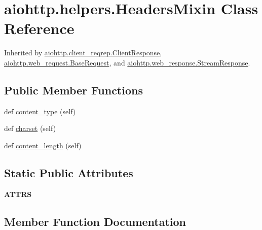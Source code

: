 \hypertarget{classaiohttp_1_1helpers_1_1_headers_mixin}{}\section{aiohttp.\+helpers.\+Headers\+Mixin Class Reference}
\label{classaiohttp_1_1helpers_1_1_headers_mixin}


Inherited by \hyperlink{classaiohttp_1_1client__reqrep_1_1_client_response}{aiohttp.\+client\+\_\+reqrep.\+Client\+Response}, \hyperlink{classaiohttp_1_1web__request_1_1_base_request}{aiohttp.\+web\+\_\+request.\+Base\+Request}, and \hyperlink{classaiohttp_1_1web__response_1_1_stream_response}{aiohttp.\+web\+\_\+response.\+Stream\+Response}.

\subsection*{Public Member Functions}
\begin{DoxyCompactItemize}
\item 
def \hyperlink{classaiohttp_1_1helpers_1_1_headers_mixin_a2eefac14c847b3349d202930afe4035c}{content\+\_\+type} (self)
\item 
def \hyperlink{classaiohttp_1_1helpers_1_1_headers_mixin_aa636709b904b99b7d042984c36e6c95b}{charset} (self)
\item 
def \hyperlink{classaiohttp_1_1helpers_1_1_headers_mixin_a88e587821ae34d8f6c8608f8d8b48d93}{content\+\_\+length} (self)
\end{DoxyCompactItemize}
\subsection*{Static Public Attributes}
\begin{DoxyCompactItemize}
\item 
{\bfseries A\+T\+T\+RS}
\end{DoxyCompactItemize}


\subsection{Member Function Documentation}
\mbox{\label{classaiohttp_1_1helpers_1_1_headers_mixin_aa636709b904b99b7d042984c36e6c95b}} 
